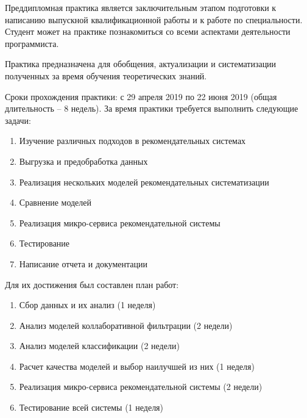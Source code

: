 Преддипломная практика ­является заключительным этапом подготовки к написанию
выпускной квалификационной работы и к работе по специальности. Студент может на
практике познакомиться со всеми аспектами деятельности программиста.

Практика предназначена для обобщения, актуа­лизации и систематизации полученных
за время обучения теоретических знаний.

Сроки прохождения практики: с 29 апреля 2019 по 22 июня 2019 (общая
длительность – 8 недель).
За время практики требуется выполнить следующие задачи:
\begin{enumerate}
  \item Изучение различных подходов в рекомендательных системах
  \item Выгрузка и предобработка данных
  \item Реализация нескольких моделей рекомендательных систематизации
  \item Сравнение моделей
  \item Реализация микро-сервиса рекомендательной системы
  \item Тестирование
  \item Написание отчета и документации
\end{enumerate}
Для их достижения был составлен план работ:
\begin{enumerate}
  \item Сбор данных и их анализ (1 неделя)
  \item Анализ моделей коллаборативной фильтрации (2 недели)
  \item Анализ моделей классификации (2 недели)
  \item Расчет качества моделей и выбор наилучшей из них (1 неделя)
  \item Реализация микро-сервиса рекомендательной системы (2 недели)
  \item Тестирование всей системы (1 неделя)
\end{enumerate}
